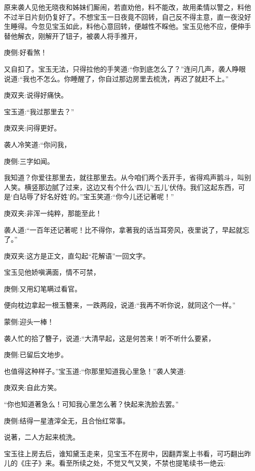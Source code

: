 \begin{parag}
    原来袭人见他无晓夜和姊妹们厮闹，若直劝他，料不能改，故用柔情以警之，料他不过半日片刻仍复好了。不想宝玉一日夜竟不回转，自己反不得主意，直一夜没好生睡得。今忽见宝玉如此，料他心意回转，便越性不睬他。宝玉见他不应，便伸手替他解衣，刚解开了钮子，被袭人将手推开，\begin{note}庚侧:好看煞！\end{note}又自扣了。宝玉无法，只得拉他的手笑道:“你到底怎么了？”连问几声，袭人睁眼说道:“我也不怎么。你睡醒了，你自过那边房里去梳洗，再迟了就赶不上。”\begin{note}庚双夹:说得好痛快。\end{note}宝玉道:“我过那里去？”\begin{note}庚双夹:问得更好。\end{note}袭人冷笑道:“你问我，\begin{note}庚侧:三字如闻。\end{note}我知道？你爱往那里去，就往那里去。从今咱们两个丢开手，省得鸡声鹅斗，叫别人笑。横竖那边腻了过来，这边又有个什么‘四儿’‘五儿’伏侍。我们这起东西，可是‘白玷辱了好名好姓’的。”宝玉笑道:“你今儿还记著呢！”\begin{note}庚双夹:非浑一纯粹，那能至此！\end{note}袭人道:“一百年还记著呢！比不得你，拿著我的话当耳旁风，夜里说了，早起就忘了。”\begin{note}庚双夹:这方是正文，直勾起“花解语”一回文字。\end{note}宝玉见他娇嗔满面，情不可禁，\begin{note}庚侧:又用幻笔瞒过看官。\end{note}便向枕边拿起一根玉簪来，一跌两段，说道:“我再不听你说，就同这个一样。”\begin{note}蒙侧:迎头一棒！\end{note}袭人忙的拾了簪子，说道:“大清早起，这是何苦来！听不听什么要紧，\begin{note}庚侧:已留后文地步。\end{note}也值得这种样子。”宝玉道:“你那里知道我心里急！”袭人笑道:\begin{note}庚双夹:自此方笑。\end{note}“你也知道著急么！可知我心里怎么著？快起来洗脸去罢。”\begin{note}庚侧:结得一星渣滓全无，且合怡红常事。\end{note}说著，二人方起来梳洗。
\end{parag}


\begin{parag}
    宝玉往上房去后，谁知黛玉走来，见宝玉不在房中，因翻弄案上书看，可巧翻出昨儿的《庄子》来。看至所续之处，不觉又气又笑，不禁也提笔续书一绝云:
\end{parag}


